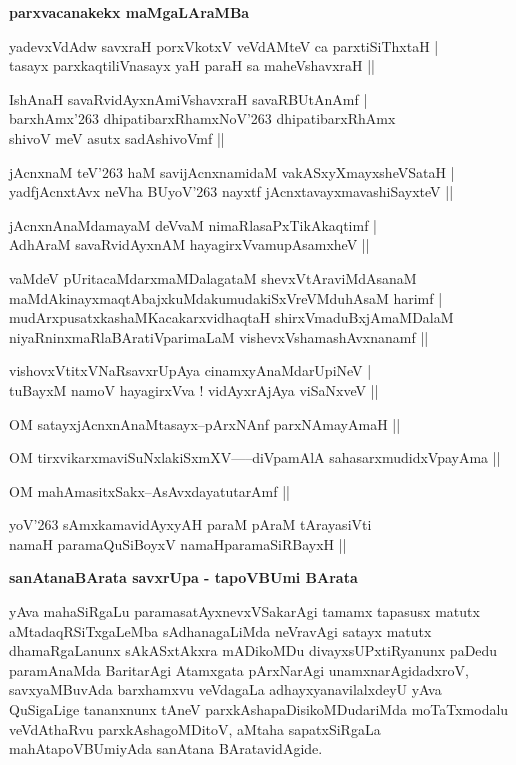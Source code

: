{\bigskip
\noindent
{\large\bf parxvacanakekx maMgaLAraMBa}}\label{page102}
\begin{description}
{\bf
\item [1)] yadevxVdAdw savxraH porxVkotxV veVdAMteV ca parxtiSiThxtaH |\label{102}\\ tasayx parxkaqtiliVnasayx yaH paraH sa maheVshavxraH ||
\item [2)] IshAnaH savaRvidAyxnAmiVshavxraH savaRBUtAnAmf |\label{102a}\\ barxhAmx\char'263 dhipatibarxRhamxNoV\char'263 dhipatibarxRhAmx\\ shivoV meV asutx sadAshivoVmf ||
\item [3)] jAcnxnaM teV\char'263 haM savijAcnxnamidaM vakASxyXmayxsheVSataH |\label{102b}\\ yadfjAcnxtAvx neVha BUyoV\char'263 nayxtf jAcnxtavayxmavashiSayxteV ||
\item [4)] jAcnxnAnaMdamayaM deVvaM nimaRlasaPxTikAkaqtimf |\\ AdhAraM savaRvidAyxnAM hayagirxVvamupAsamxheV ||\label{102c}
\item [5)] vaMdeV pUritacaMdarxmaMDalagataM shevxVtAraviMdAsanaM \label{102d}\\ maMdAkinayxmaqtAbajxkuMdakumudakiSxVreVMduhAsaM harimf |\\ mudArxpusatxkashaMKacakarxvidhaqtaH shirxVmaduBxjAmaMDalaM\\ niyaRninxmaRlaBAratiVparimaLaM vishevxVshamashAvxnanamf ||
\item [6)] vishovxVtitxVNaRsavxrUpAya cinamxyAnaMdarUpiNeV |\\\label{102e} tuBayxM namoV hayagirxVva ! vidAyxrAjAya viSaNxveV ||
\item [7)] OM satayxjAcnxnAnaMtasayx--pArxNAnf parxNAmayAmaH ||\label{81b}\label{103}
\item [8)] OM tirxvikarxmaviSuNxlakiSxmXV-----diVpamAlA sahasarxmudidxVpayAma ||\label{103a}
\item [9)] OM mahAmasitxSakx--AsAvxdayatutarAmf ||\label{103b}
\item [10)] yoV\char'263 sAmxkamavidAyxyAH paraM pAraM tArayasiVti\\\label{103c} namaH paramaQuSiBoyxV namaHparamaSiRBayxH ||}
\end{description}

\medskip

{\noindent
{\large\bf sanAtanaBArata savxrUpa - tapoVBUmi BArata}}\label{page103}
\medskip

\noindent
yAva mahaSiRgaLu paramasatAyxnevxVSakarAgi tamamx tapasusx matutx aMtadaqRSiTxgaLeMba sAdhanagaLiMda neVravAgi satayx matutx dhamaRgaLanunx sAkASxtAkxra mADikoMDu divayxsUPxtiRyanunx paDedu paramAnaMda BaritarAgi Atamxgata pArxNarAgi unamxnarAgidadxroV, savxyaMBuvAda barxhamxvu veVdagaLa adhayxyanavilalxdeyU yAva QuSigaLige tananxnunx tAneV parxkAshapaDisikoMDudariMda moTaTxmodalu veVdAthaRvu parxkAshagoMDitoV, aMtaha sapatxSiRgaLa mahAtapoVBUmiyAda sanAtana BAratavidAgide.

